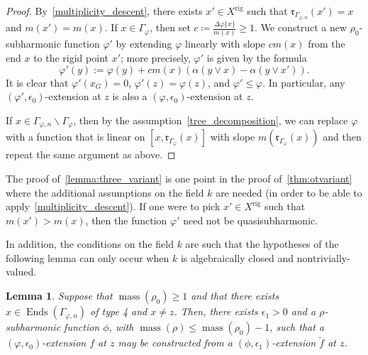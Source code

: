 \documentclass[10pt,reqno]{amsart}
\theoremstyle{plain}
\newtheorem{lemma}[theorem]{Lemma}
\theoremstyle{definition}
\newcommand{\frakm}{\mathfrak{m}}
\numberwithin{equation}{section}
\DeclareMathOperator{\Ends}{Ends}
\DeclareMathOperator{\mass}{mass}
\DeclareMathOperator{\rig}{rig}
\begin{document}
\begin{proof}
By~\cref{multiplicity_descent}, there exists $x' \in X^{\rig}$ such that $\mathfrak{r}_{\Gamma_{\varphi,n}}(x') = x$ and $m(x') = m(x)$.
If $x \in \Gamma_{\varphi}$, then set 
$c \coloneqq \frac{\Delta \varphi \{ x \}}{m(x)} \geq 1$.
We construct a new $\rho_0$-subharmonic function $\varphi'$ by extending $\varphi$ linearly with slope $c m(x)$ from the end $x$ to the rigid point $x'$; more precisely, $\varphi'$ is given by the formula
$$
\varphi'(y) := \varphi(y) 
+c m(x)\left( \alpha(y \vee x) - \alpha (y \vee x') \right).
$$
It is clear that $\varphi'(x_G) = 0$, $\varphi'(z) = \varphi(z)$, and $\varphi' \leq \varphi$. In particular, any $(\varphi',\epsilon_0)$-extension at $z$ is also a $(\varphi,\epsilon_0)$-extension at $z$. 
%

If $x \in \Gamma_{\varphi,n} \backslash \Gamma_{\varphi}$, then by the assumption~\cref{tree_decomposition}, we can 
replace $\varphi$ with a function that is linear on $[x, \mathfrak{r}_{\Gamma_{\varphi}}(x)]$ with slope $m(\mathfrak{r}_{\Gamma_{\varphi}}(x))$ and then repeat the same argument as above.
\end{proof}

The proof of~\cref{lemma:three_variant} is one point in the proof of~\cref{thm:otvariant} where the additional assumptions on the field $k$ are needed (in order to be able to apply~\cref{multiplicity_descent}). If one were to pick $x' \in X^{\rig}$ such that $m(x') > m(x)$, then the function $\varphi'$ need not be quasisubharmonic. 

In addition, the conditions on the field $k$ are such that the hypotheses of the following lemma can only occur when $k$ is algebraically closed and nontrivially-valued.

\begin{lemma}\label{lemma:four_variant}
Suppose that $\mass(\rho_0) \geq 1$ and that there exists $x \in \Ends(\Gamma_{\varphi,n})$ of type 4 and $x \not= z$. Then, there exists $\epsilon_1 > 0$ and a $\rho$-subharmonic function $\phi$, with $\mass(\rho) \leq \mass(\rho_0) - 1$, such that a $(\varphi,\epsilon_0)$-extension $f$ at $z$ may be constructed from a $(\phi,\epsilon_1)$-extension $\tilde{f}$ at $z$.
\end{lemma}
\end{document}
